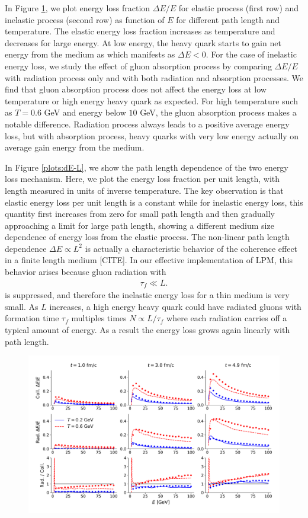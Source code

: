 \documentclass[aps, prc, reprint, amsmath, groupedaddress, nofootinbib]{revtex4-1}
\begin{document}
In Figure \ref{plots:dE-E}, we plot energy loss fraction $\Delta E/E$ for elastic process (first row) and inelastic process (second row) as function of $E$ for different path length and temperature.
The elastic energy loss fraction increases as temperature and decreases for large energy.
At low energy, the heavy quark starts to gain net energy from the medium as which manifests as $\Delta E < 0$.
For the case of inelastic energy loss, we study the effect of gluon absorption process by comparing $\Delta E/E$ with radiation process only and with both radiation and absorption processes.
We find that gluon absorption process does not affect the energy loss at low temperature or high energy heavy quark as expected.
For high temperature such as $T=0.6$ GeV and energy below $10$ GeV, the gluon absorption process makes a notable difference.
Radiation process always leads to a positive average energy loss, but with absorption process, heavy quarks with very low energy actually on average gain energy from the medium.

In Figure \ref{plots:dE-L}, we show the path length dependence of the two energy loss mechanism.
Here, we plot the energy loss fraction per unit length, with length measured in units of inverse temperature.
The key observation is that elastic energy loss per unit length is a constant while for inelastic energy loss, this quantity first increases from zero for small path length and then gradually approaching a limit for large path length, showing a different medium size dependence of energy loss from the elastic process.
The non-linear path length dependence $\Delta E \propto L^2$ is actually a characteristic behavior of the coherence effect in a finite length medium [CITE]. 
In our effective implementation of LPM, this behavior arises because gluon radiation with
\begin{eqnarray}
\tau_f \ll L.
\end{eqnarray}
is suppressed, and therefore the inelastic energy loss for a thin medium is very small.
As $L$ increases, a high energy heavy quark could have radiated gluons with formation time $\tau_f$ multiples times $N \propto L/\tau_f$ where each radiation carries off a typical amount of energy. 
As a result the energy loss grows again linearly with path length.


\begin{figure}
\includegraphics[width=\textwidth]{E_Eloss.pdf}
\caption{}\label{plots:dE-E}
\end{figure}
\end{document}
